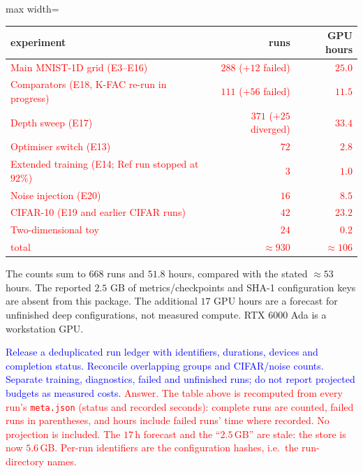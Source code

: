 \documentclass{article}
\newcommand{\zied}[1]{\textcolor{blue}{#1}}
\newcommand{\nat}[1]{\textcolor{red}{#1}}
\theoremstyle{definition}
\theoremstyle{remark}
\begin{document}
\begin{center}\small
\begin{adjustbox}{max width=\linewidth}
\begin{tabular}{lrr}
\toprule
experiment & runs & GPU hours \\
\midrule
\nat{Main MNIST-1D grid (E3--E16)} & \nat{$288$ ($+12$ failed)} & \nat{$25.0$} \\
\nat{Comparators (E18, K-FAC re-run in progress)} & \nat{$111$ ($+56$ failed)} & \nat{$11.5$} \\
\nat{Depth sweep (E17)} & \nat{$371$ ($+25$ diverged)} & \nat{$33.4$} \\
\nat{Optimiser switch (E13)} & \nat{$72$} & \nat{$2.8$} \\
\nat{Extended training (E14; Ref run stopped at $92\%$)} & \nat{$3$} & \nat{$1.0$} \\
\nat{Noise injection (E20)} & \nat{$16$} & \nat{$8.5$} \\
\nat{CIFAR-10 (E19 and earlier CIFAR runs)} & \nat{$42$} & \nat{$23.2$} \\
\nat{Two-dimensional toy} & \nat{$24$} & \nat{$0.2$} \\
\midrule
\nat{total} & \nat{$\approx930$} & \nat{$\approx106$} \\
\bottomrule
\end{tabular}
\end{adjustbox}
\end{center}

The counts sum to $668$ runs and $51.8$ hours, compared with the stated $\approx53$ hours. The reported $2.5$ GB of metrics/checkpoints and SHA-1 configuration keys are absent from this package. The additional $17$ GPU hours are a forecast for unfinished deep configurations, not measured compute. RTX 6000 Ada is a workstation GPU.

\zied{ Release a deduplicated run ledger with identifiers, durations, devices and completion status. Reconcile overlapping groups and CIFAR/noise counts. Separate training, diagnostics, failed and unfinished runs; do not report projected budgets as measured costs.}
\nat{Answer. The table above is recomputed from every run's \texttt{meta.json} (status and recorded seconds): complete runs are counted, failed runs in parentheses, and hours include failed runs' time where recorded. No projection is included. The $17$\,h forecast and the ``$2.5$\,GB'' are stale: the store is now $5.6$\,GB. Per-run identifiers are the configuration hashes, i.e.\ the run-directory names.}
\end{document}
